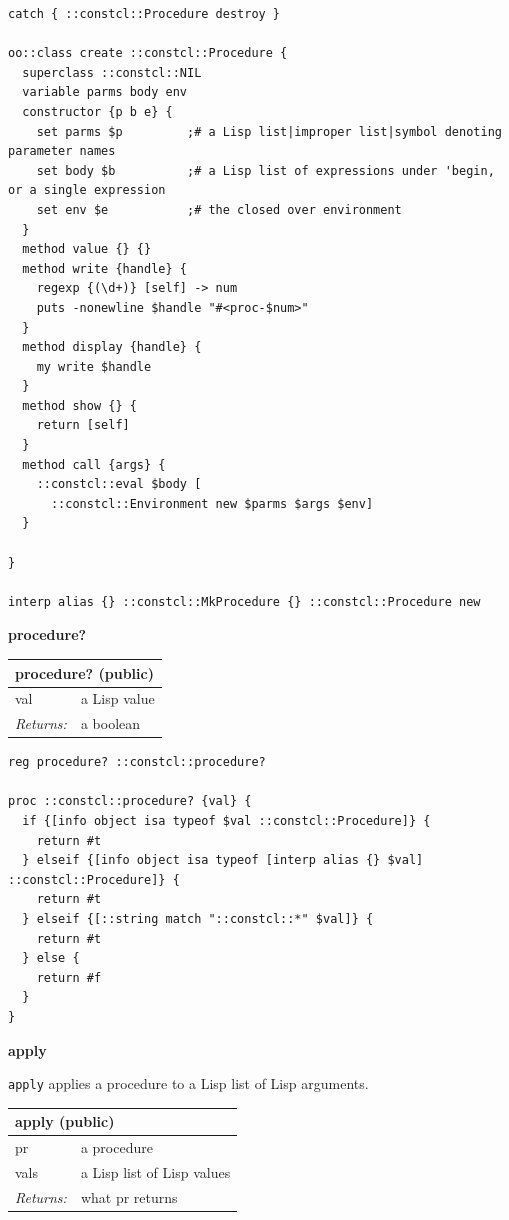 \documentclass[twoside,9pt]{report}
\begin{document}
\noindent\makebox[\linewidth]{\rule{\linewidth}{0.4pt}}
\begin{lstlisting}
catch { ::constcl::Procedure destroy }
 
oo::class create ::constcl::Procedure {
  superclass ::constcl::NIL
  variable parms body env
  constructor {p b e} {
    set parms $p         ;# a Lisp list|improper list|symbol denoting parameter names
    set body $b          ;# a Lisp list of expressions under 'begin, or a single expression
    set env $e           ;# the closed over environment
  }
  method value {} {}
  method write {handle} {
    regexp {(\d+)} [self] -> num
    puts -nonewline $handle "#<proc-$num>"
  }
  method display {handle} {
    my write $handle
  }
  method show {} {
    return [self]
  }
  method call {args} {
    ::constcl::eval $body [
      ::constcl::Environment new $parms $args $env]
  }
 
}
 
interp alias {} ::constcl::MkProcedure {} ::constcl::Procedure new
\end{lstlisting}
\noindent\makebox[\linewidth]{\rule{\linewidth}{0.4pt}}

\textbf{procedure?}

\begin{tabular}{ |l l| }
\hline
\multicolumn{2}{|l|}{procedure? (public)} \\
\hline
val & a Lisp value \\
\textit{Returns:} & a boolean \\
\hline
\end{tabular}

\noindent\makebox[\linewidth]{\rule{\linewidth}{0.4pt}}
\begin{lstlisting}
reg procedure? ::constcl::procedure?
 
proc ::constcl::procedure? {val} {
  if {[info object isa typeof $val ::constcl::Procedure]} {
    return #t
  } elseif {[info object isa typeof [interp alias {} $val] ::constcl::Procedure]} {
    return #t
  } elseif {[::string match "::constcl::*" $val]} {
    return #t
  } else {
    return #f
  }
}
\end{lstlisting}
\noindent\makebox[\linewidth]{\rule{\linewidth}{0.4pt}}

\textbf{apply}


\texttt{apply} applies a procedure to a Lisp list of Lisp arguments.

\begin{tabular}{ |l l| }
\hline
\multicolumn{2}{|l|}{apply (public)} \\
\hline
pr & a procedure \\
vals & a Lisp list of Lisp values \\
\textit{Returns:} & what pr returns \\
\hline
\end{tabular}
\end{document}
